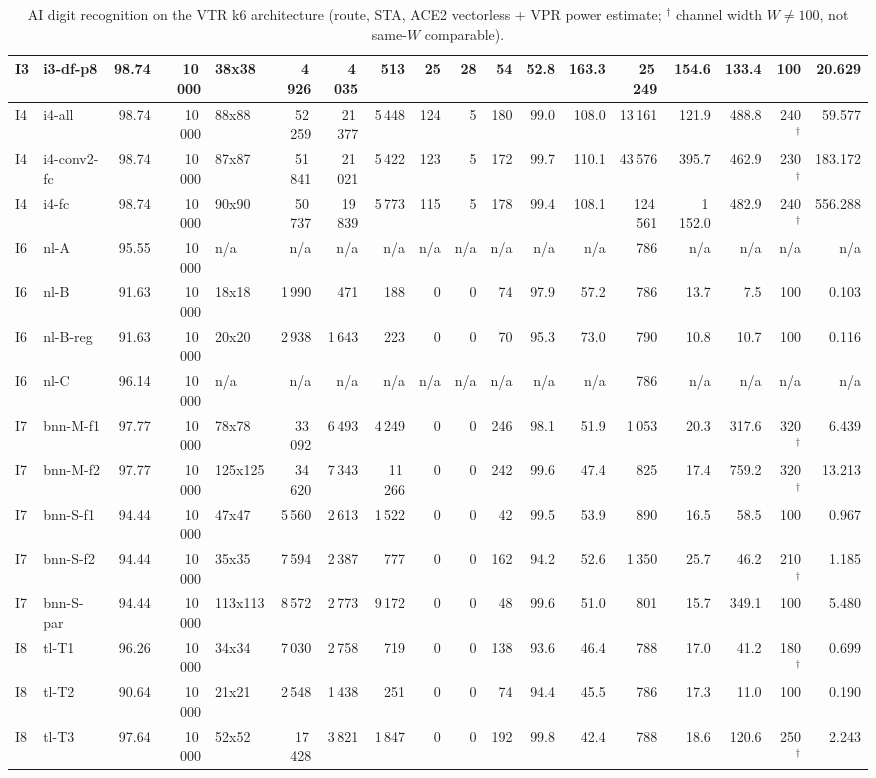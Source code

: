 \begin{table}[t]
\begin{tabular}{llrrlrrrrrrrrrrrrr}
I3 & i3-df-p8 & 98.74 & 10\,000 & 38x38 & 4\,926 & 4\,035 & 513 & 25 & 28 & 54 & 52.8 & 163.3 & 25\,249 & 154.6 & 133.4 & 100 & 20.629 \\
\midrule
I4 & i4-all & 98.74 & 10\,000 & 88x88 & 52\,259 & 21\,377 & 5\,448 & 124 & 5 & 180 & 99.0 & 108.0 & 13\,161 & 121.9 & 488.8 & 240$^\dagger$ & 59.577 \\
I4 & i4-conv2-fc & 98.74 & 10\,000 & 87x87 & 51\,841 & 21\,021 & 5\,422 & 123 & 5 & 172 & 99.7 & 110.1 & 43\,576 & 395.7 & 462.9 & 230$^\dagger$ & 183.172 \\
I4 & i4-fc & 98.74 & 10\,000 & 90x90 & 50\,737 & 19\,839 & 5\,773 & 115 & 5 & 178 & 99.4 & 108.1 & 124\,561 & 1\,152.0 & 482.9 & 240$^\dagger$ & 556.288 \\
\midrule
I6 & nl-A & 95.55 & 10\,000 & n/a & n/a & n/a & n/a & n/a & n/a & n/a & n/a & n/a & 786 & n/a & n/a & n/a & n/a \\
I6 & nl-B & 91.63 & 10\,000 & 18x18 & 1\,990 & 471 & 188 & 0 & 0 & 74 & 97.9 & 57.2 & 786 & 13.7 & 7.5 & 100 & 0.103 \\
I6 & nl-B-reg & 91.63 & 10\,000 & 20x20 & 2\,938 & 1\,643 & 223 & 0 & 0 & 70 & 95.3 & 73.0 & 790 & 10.8 & 10.7 & 100 & 0.116 \\
I6 & nl-C & 96.14 & 10\,000 & n/a & n/a & n/a & n/a & n/a & n/a & n/a & n/a & n/a & 786 & n/a & n/a & n/a & n/a \\
\midrule
I7 & bnn-M-f1 & 97.77 & 10\,000 & 78x78 & 33\,092 & 6\,493 & 4\,249 & 0 & 0 & 246 & 98.1 & 51.9 & 1\,053 & 20.3 & 317.6 & 320$^\dagger$ & 6.439 \\
I7 & bnn-M-f2 & 97.77 & 10\,000 & 125x125 & 34\,620 & 7\,343 & 11\,266 & 0 & 0 & 242 & 99.6 & 47.4 & 825 & 17.4 & 759.2 & 320$^\dagger$ & 13.213 \\
I7 & bnn-S-f1 & 94.44 & 10\,000 & 47x47 & 5\,560 & 2\,613 & 1\,522 & 0 & 0 & 42 & 99.5 & 53.9 & 890 & 16.5 & 58.5 & 100 & 0.967 \\
I7 & bnn-S-f2 & 94.44 & 10\,000 & 35x35 & 7\,594 & 2\,387 & 777 & 0 & 0 & 162 & 94.2 & 52.6 & 1\,350 & 25.7 & 46.2 & 210$^\dagger$ & 1.185 \\
I7 & bnn-S-par & 94.44 & 10\,000 & 113x113 & 8\,572 & 2\,773 & 9\,172 & 0 & 0 & 48 & 99.6 & 51.0 & 801 & 15.7 & 349.1 & 100 & 5.480 \\
\midrule
I8 & tl-T1 & 96.26 & 10\,000 & 34x34 & 7\,030 & 2\,758 & 719 & 0 & 0 & 138 & 93.6 & 46.4 & 788 & 17.0 & 41.2 & 180$^\dagger$ & 0.699 \\
I8 & tl-T2 & 90.64 & 10\,000 & 21x21 & 2\,548 & 1\,438 & 251 & 0 & 0 & 74 & 94.4 & 45.5 & 786 & 17.3 & 11.0 & 100 & 0.190 \\
I8 & tl-T3 & 97.64 & 10\,000 & 52x52 & 17\,428 & 3\,821 & 1\,847 & 0 & 0 & 192 & 99.8 & 42.4 & 788 & 18.6 & 120.6 & 250$^\dagger$ & 2.243 \\
\bottomrule
\end{tabular}
\caption{AI digit recognition on the VTR k6 architecture (route, STA, ACE2 vectorless + VPR power estimate; $^\dagger$ channel width $W \ne 100$, not same-$W$ comparable).}
\label{tab:aidigit-vtr}
\end{table}

